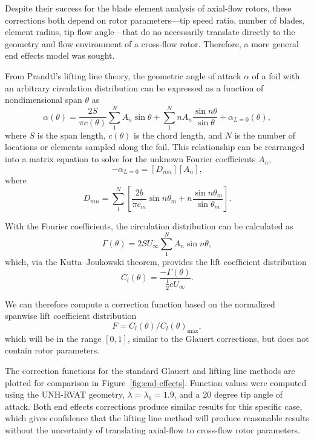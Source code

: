 Despite their success for the blade element analysis of axial-flow rotors, these
corrections both depend on rotor parameters---tip speed ratio, number of blades,
element radius, tip flow angle---that do no necessarily translate directly to
the geometry and flow environment of a cross-flow rotor. Therefore, a more
general end effects model was sought.

From Prandtl's lifting line theory, the geometric angle of attack $\alpha$ of a
foil with an arbitrary circulation distribution can be expressed as a function
of nondimensional span $\theta$ as \cite{Anderson2001}
\begin{equation}
    \alpha (\theta) = \frac{2S}{\pi c (\theta)}
    \sum_1^N A_n \sin \theta
    + \sum_1^N n A_n \frac{\sin n \theta}{\sin \theta}
    + \alpha_{L = 0}(\theta),
    \label{eq:lifting-line}
\end{equation}
where $S$ is the span length, $c(\theta)$ is the chord length, and $N$ is the
number of locations or elements sampled along the foil. This relationship can be
rearranged into a matrix equation to solve for the unknown Fourier coefficients
$A_n$,
\begin{equation}
    [\alpha_m ] - \alpha_{L=0} = [D_{mn}][A_n],
\end{equation}
where
\begin{equation}
    D_{mn} = \sum_1^N \left[ \frac{2b}{\pi c_m} \sin n \theta_m + n \frac{\sin n
        \theta_m}{\sin \theta_m} \right].
\end{equation}

With the Fourier coefficients, the circulation distribution can be calculated as
\begin{equation}
    \Gamma (\theta) = 2SU_\infty \sum_1^N A_n \sin n \theta,
\end{equation}
which, via the Kutta--Joukowski theorem, provides the lift coefficient
distribution
\begin{equation}
    C_l(\theta) = \frac{-\Gamma (\theta)}{\frac{1}{2} c U_\infty}.
\end{equation}

We can therefore compute a correction function based on the normalized spanwise
lift coefficient distribution
\begin{equation}
    F = C_l(\theta)/C_l(\theta)_{\max},
\end{equation}
which will be in the range $[0, 1]$, similar to the Glauert corrections, but
does not contain rotor parameters.

The correction functions for the standard Glauert and lifting line methods are
plotted for comparison in Figure~\ref{fig:end-effects}. Function values were
computed using the UNH-RVAT geometry, $\lambda = \lambda_0 = 1.9$, and a 20
degree tip angle of attack. Both end effects corrections produce similar results
for this specific case, which gives confidence that the lifting line method will
produce reasonable results without the uncertainty of translating axial-flow to
cross-flow rotor parameters.

